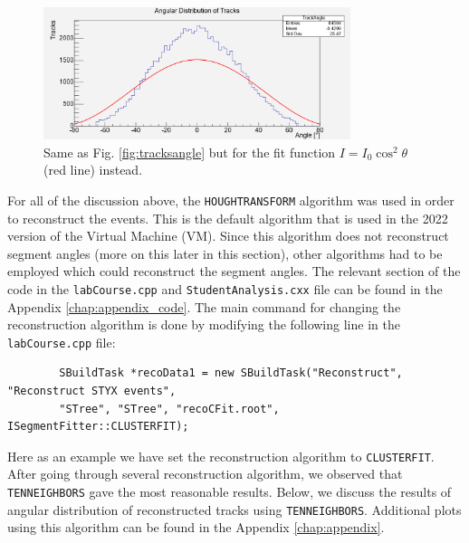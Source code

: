 \documentclass[a4paper]{report}
\numberwithin{equation}{section}
\begin{document}
\begin{figure}[htb!]
	\centering
	\includegraphics[width=0.8\textwidth]{trackangle_cos2fit.png}
	\caption{Same as Fig. \ref{fig:tracksangle} but for the fit function $I = I_0 \cos^2 \theta$ (red line) instead. }
	\label{fig:tracksangle_cos2fit}
\end{figure} \par

For all of the discussion above, the \texttt{HOUGHTRANSFORM} algorithm was used in order to reconstruct the events. 
This is the default algorithm that is used in the 2022 version of the Virtual Machine (VM). Since this algorithm 
does not reconstruct segment angles (more on this later in this section), other algorithms had to be employed which 
could reconstruct the segment angles. The relevant section of the code in the \texttt{labCourse.cpp} and \texttt{StudentAnalysis.cxx} file 
can be found in the Appendix \ref{chap:appendix_code}. The main command for changing the reconstruction algorithm 
is done by modifying the following line in the \texttt{labCourse.cpp} file:

\begin{tcolorbox}
	\begin{verbatim}
		SBuildTask *recoData1 = new SBuildTask("Reconstruct", "Reconstruct STYX events",
        "STree", "STree", "recoCFit.root", ISegmentFitter::CLUSTERFIT);
	\end{verbatim}
\end{tcolorbox}

\noindent Here as an example we have set the reconstruction algorithm to \texttt{CLUSTERFIT}. 
After going through several reconstruction algorithm, we observed that \texttt{TENNEIGHBORS} gave the most reasonable results. 
Below, we discuss the results of angular distribution of reconstructed tracks using \texttt{TENNEIGHBORS}. 
Additional plots using this algorithm can be found in the Appendix \ref{chap:appendix}.
\end{document}
